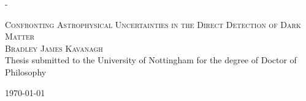 \calccentering{\unitlength}                         %
\begin{adjustwidth*}{\unitlength}{-\unitlength}     %
    \begin{adjustwidth}{-1cm}{-1cm}                 %
      \begin{titlingpage}
      \begin{center}


      \textsc{\LARGE Confronting Astrophysical Uncertainties in the Direct Detection of Dark Matter}\\[1.5cm]

      \textsc{\Large Bradley James Kavanagh}\\[0.5cm]


      Thesis submitted to the University of Nottingham for the degree of Doctor of Philosophy

      \vfill

      {\large \mydate\today}

      \end{center}
      \end{titlingpage}
    \end{adjustwidth}
\end{adjustwidth*}
